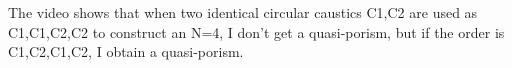 The video shows that when two identical circular caustics C1,C2 are used as C1,C1,C2,C2 to construct an N=4, I don't get a quasi-porism, but if the order is C1,C2,C1,C2, I obtain a quasi-porism.